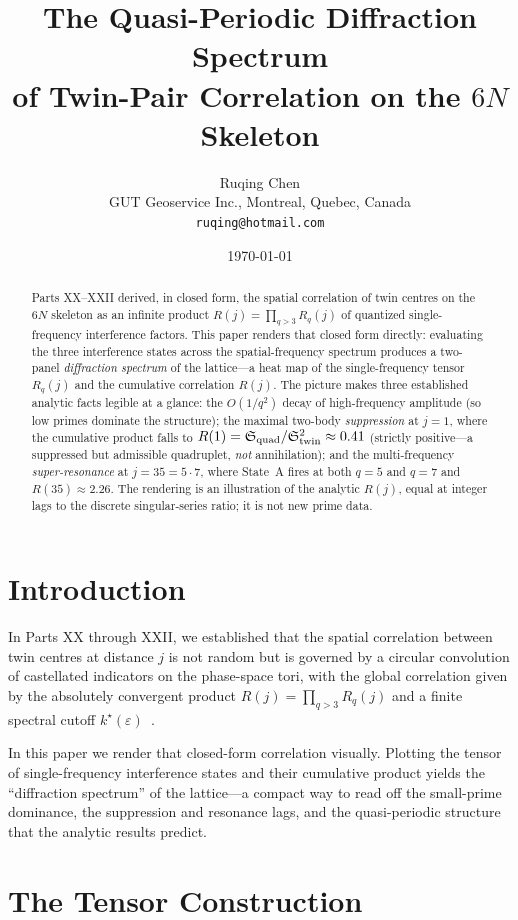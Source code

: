 \documentclass[11pt,a4paper]{article}
\title{\Large \textbf{The Quasi-Periodic Diffraction Spectrum\\ of Twin-Pair Correlation on the $6N$ Skeleton}}
\author{Ruqing Chen\\
\small GUT Geoservice Inc., Montreal, Quebec, Canada\\
\small \texttt{ruqing@hotmail.com}}
\date{\today}
\begin{document}
\maketitle

\begin{abstract}
Parts XX--XXII derived, in closed form, the spatial correlation of twin centres on
the $6N$ skeleton as an infinite product $R(j)=\prod_{q>3}R_q(j)$ of quantized
single-frequency interference factors. This paper renders that closed form
directly: evaluating the three interference states across the spatial-frequency
spectrum produces a two-panel \emph{diffraction spectrum} of the lattice---a
heat map of the single-frequency tensor $R_q(j)$ and the cumulative correlation
$R(j)$. The picture makes three established analytic facts legible at a glance:
the $O(1/q^2)$ decay of high-frequency amplitude (so low primes dominate the
structure); the maximal two-body \emph{suppression} at $j=1$, where the cumulative
product falls to $R(1)=\mathfrak{S}_{\rm quad}/\mathfrak{S}_{\rm twin}^2\approx0.41$
(strictly positive---a suppressed but admissible quadruplet, \emph{not}
annihilation); and the multi-frequency \emph{super-resonance} at $j=35=5\cdot7$,
where State~A fires at both $q=5$ and $q=7$ and $R(35)\approx2.26$. The rendering
is an illustration of the analytic $R(j)$, equal at integer lags to the discrete
singular-series ratio; it is not new prime data.
\end{abstract}

\section{Introduction}
In Parts XX through XXII, we established that the spatial correlation between twin
centres at distance $j$ is not random but is governed by a circular convolution of
castellated indicators on the phase-space tori, with the global correlation given
by the absolutely convergent product $R(j)=\prod_{q>3}R_q(j)$ and a finite spectral
cutoff $k^\star(\varepsilon)$~\cite{ChenXX,ChenXXI,ChenXXII}.

In this paper we render that closed-form correlation visually. Plotting the tensor
of single-frequency interference states and their cumulative product yields the
``diffraction spectrum'' of the lattice---a compact way to read off the
small-prime dominance, the suppression and resonance lags, and the quasi-periodic
structure that the analytic results predict.

\section{The Tensor Construction}
\end{document}
